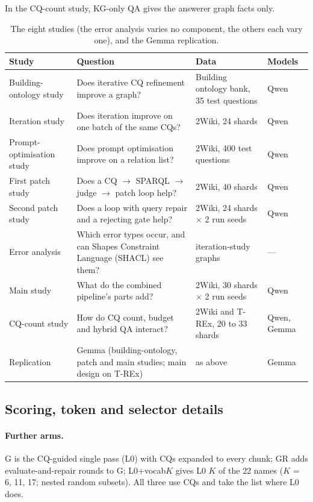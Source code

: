 In the CQ-count study, KG-only QA gives the answerer graph facts only.

\begin{table}[!t]
\centering
\scriptsize\setlength{\tabcolsep}{3pt}\renewcommand{\arraystretch}{0.7}
\caption{The eight studies (the error analysis varies no component, the others each vary one), and the Gemma replication.}
\label{tab:experiments}
\begin{tabular}{lp{9.4cm}p{5.0cm}l}
\toprule
Study & Question & Data & Models \\
\midrule
Building-ontology study & Does iterative CQ refinement improve a graph? & Building ontology bank, 35 test questions & Qwen \\
Iteration study & Does iteration improve on one batch of the same CQs? & 2Wiki, 24 shards & Qwen \\
Prompt-optimisation study & Does prompt optimisation improve on a relation list? & 2Wiki, 400 test questions & Qwen \\
First patch study & Does a CQ $\rightarrow$ SPARQL $\rightarrow$ judge $\rightarrow$ patch loop help? & 2Wiki, 40 shards & Qwen \\
Second patch study & Does a loop with query repair and a rejecting gate help? & 2Wiki, 24 shards $\times$ 2 run seeds & Qwen \\
Error analysis & Which error types occur, and can Shapes Constraint Language (SHACL) see them? & iteration-study graphs & --- \\
Main study & What do the combined pipeline's parts add? & 2Wiki, 30 shards $\times$ 2 run seeds & Qwen \\
CQ-count study & How do CQ count, budget and hybrid QA interact? & 2Wiki and T-REx, 20 to 33 shards & Qwen, Gemma \\
Replication & Gemma (building-ontology, patch and main studies; main design on T-REx) & as above & Gemma \\
\bottomrule
\end{tabular}
\end{table}

\subsection{Scoring, token and selector details}
\label{app:details}
\paragraph{Further arms.}\label{app:armsextra} G is the CQ-guided single pass (L0) with CQs expanded to every chunk; GR adds evaluate-and-repair rounds to G; L0+vocab$K$ gives L0 $K$ of the 22 names ($K$ = 6, 11, 17; nested random subsets). All three use CQs and take the list where L0 does.


